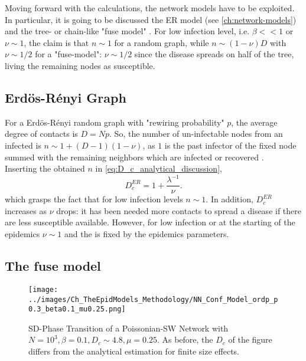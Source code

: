 \documentclass[a4paper,10pt,twoside]{book} %
\theoremstyle{definition}
\begin{document}
Moving forward with the calculations, the network models have to be exploited. In particular, it is going to be discussed the ER model (see \autoref{ch:network-models}) and the tree- or chain-like "fuse model" \cite{Thurner::NetBasedExpl}. For low infection level, i.e. $\beta<<1$ or $\nu\sim1$, the claim is that $n\sim 1$ for a random graph, while $n \sim (1-\nu)D$ with $\nu\sim 1/2$ for a "fuse-model": $\nu\sim 1/2$ since the disease spreads on half of the tree, living the remaining nodes as susceptible. 

\subsection*{Erdös-Rényi Graph}
For a Erdös-Rényi random graph with "rewiring probability" $p$, the average degree of contacts is $D = Np$. So, the number of un-infectable nodes from an infected is $n \sim 1 + (D-1)(1-\nu)$, as $1$ is the past infector of the fixed node summed with the remaining neighbors which are infected or recovered \cite{Thurner::Appendix_NetBasedExpl}. 
\\Inserting the obtained $n$ in \autoref{eq:D_c_analytical_discussion}, 
\begin{equation}
	D_c^{ER} = 1 + \frac{ \lambda^{-1} }{\nu}.
	\label{eq:Dc_ERenyi}
\end{equation}
which grasps the fact that for low infection levels $n\sim1$. 
In addition, $D_c^{ER}$ increases as $\nu$ drops: it has been needed more contacts to spread a disease if there are less susceptible available. However, for low infection or at the starting of the epidemics $\nu \sim 1$ and the is fixed by the epidemics parameters.

\subsection*{The fuse model}
\begin{figure}[t]
	\texttt{[image: ../images/Ch\_TheEpidModels\_Methodology/NN\_Conf\_Model\_ordp\_p0.3\_beta0.1\_mu0.25.png]}
	\centering
	\caption{SD-Phase Transition of a Poissonian-SW Network with $N = 10^{3}, \beta = 0.1, D_c \sim 4.8, \mu = 0.25$. As before, the $D_c$ of the figure differs from the analytical estimation for finite size effects.}
	\label{fig:SD_Threshold_Fuse_Model}
\end{figure}
\end{document}
